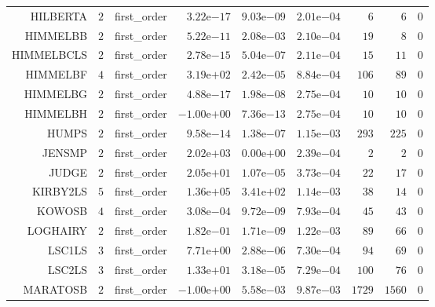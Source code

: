 \begin{longtable}{rrrrrrrrr}
HILBERTA & \(     2\) & first\_order & \( 3.22\)e\(-17\) & \( 9.03\)e\(-09\) & \( 2.01\)e\(-04\) & \(     6\) & \(     6\) & \(     0\) \\
HIMMELBB & \(     2\) & first\_order & \( 5.22\)e\(-11\) & \( 2.08\)e\(-03\) & \( 2.10\)e\(-04\) & \(    19\) & \(     8\) & \(     0\) \\
HIMMELBCLS & \(     2\) & first\_order & \( 2.78\)e\(-15\) & \( 5.04\)e\(-07\) & \( 2.11\)e\(-04\) & \(    15\) & \(    11\) & \(     0\) \\
HIMMELBF & \(     4\) & first\_order & \( 3.19\)e\(+02\) & \( 2.42\)e\(-05\) & \( 8.84\)e\(-04\) & \(   106\) & \(    89\) & \(     0\) \\
HIMMELBG & \(     2\) & first\_order & \( 4.88\)e\(-17\) & \( 1.98\)e\(-08\) & \( 2.75\)e\(-04\) & \(    10\) & \(    10\) & \(     0\) \\
HIMMELBH & \(     2\) & first\_order & \(-1.00\)e\(+00\) & \( 7.36\)e\(-13\) & \( 2.75\)e\(-04\) & \(    10\) & \(    10\) & \(     0\) \\
HUMPS & \(     2\) & first\_order & \( 9.58\)e\(-14\) & \( 1.38\)e\(-07\) & \( 1.15\)e\(-03\) & \(   293\) & \(   225\) & \(     0\) \\
JENSMP & \(     2\) & first\_order & \( 2.02\)e\(+03\) & \( 0.00\)e\(+00\) & \( 2.39\)e\(-04\) & \(     2\) & \(     2\) & \(     0\) \\
JUDGE & \(     2\) & first\_order & \( 2.05\)e\(+01\) & \( 1.07\)e\(-05\) & \( 3.73\)e\(-04\) & \(    22\) & \(    17\) & \(     0\) \\
KIRBY2LS & \(     5\) & first\_order & \( 1.36\)e\(+05\) & \( 3.41\)e\(+02\) & \( 1.14\)e\(-03\) & \(    38\) & \(    14\) & \(     0\) \\
KOWOSB & \(     4\) & first\_order & \( 3.08\)e\(-04\) & \( 9.72\)e\(-09\) & \( 7.93\)e\(-04\) & \(    45\) & \(    43\) & \(     0\) \\
LOGHAIRY & \(     2\) & first\_order & \( 1.82\)e\(-01\) & \( 1.71\)e\(-09\) & \( 1.22\)e\(-03\) & \(    89\) & \(    66\) & \(     0\) \\
LSC1LS & \(     3\) & first\_order & \( 7.71\)e\(+00\) & \( 2.88\)e\(-06\) & \( 7.30\)e\(-04\) & \(    94\) & \(    69\) & \(     0\) \\
LSC2LS & \(     3\) & first\_order & \( 1.33\)e\(+01\) & \( 3.18\)e\(-05\) & \( 7.29\)e\(-04\) & \(   100\) & \(    76\) & \(     0\) \\
MARATOSB & \(     2\) & first\_order & \(-1.00\)e\(+00\) & \( 5.58\)e\(-03\) & \( 9.87\)e\(-03\) & \(  1729\) & \(  1560\) & \(     0\) \\

\end{longtable}
